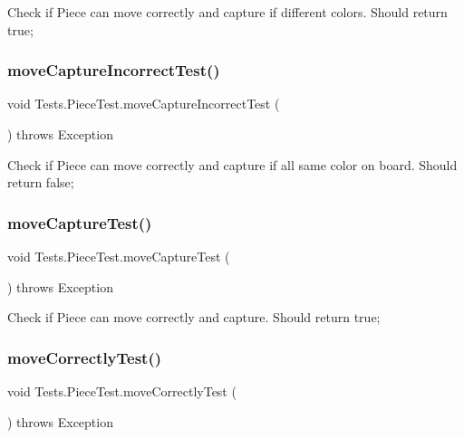 Check if Piece can move correctly and capture if different colors. Should return true; \mbox{\label{class_tests_1_1_piece_test_ac169d0c67848dc536eed9e0eb8fbfdce}} 
\subsubsection{\texorpdfstring{move\+Capture\+Incorrect\+Test()}{moveCaptureIncorrectTest()}}
{\footnotesize\ttfamily void Tests.\+Piece\+Test.\+move\+Capture\+Incorrect\+Test (\begin{DoxyParamCaption}{ }\end{DoxyParamCaption}) throws Exception\hspace{0.3cm}{\ttfamily [inline]}}

Check if Piece can move correctly and capture if all same color on board. Should return false; \mbox{\label{class_tests_1_1_piece_test_a54f13d626be4b8851a6f4c6e48cfa5a5}} 
\subsubsection{\texorpdfstring{move\+Capture\+Test()}{moveCaptureTest()}}
{\footnotesize\ttfamily void Tests.\+Piece\+Test.\+move\+Capture\+Test (\begin{DoxyParamCaption}{ }\end{DoxyParamCaption}) throws Exception\hspace{0.3cm}{\ttfamily [inline]}}

Check if Piece can move correctly and capture. Should return true; \mbox{\label{class_tests_1_1_piece_test_a0fdc15fc8b9af9c9ce04f5299f2377af}} 
\subsubsection{\texorpdfstring{move\+Correctly\+Test()}{moveCorrectlyTest()}}
{\footnotesize\ttfamily void Tests.\+Piece\+Test.\+move\+Correctly\+Test (\begin{DoxyParamCaption}{ }\end{DoxyParamCaption}) throws Exception\hspace{0.3cm}{\ttfamily [inline]}}

